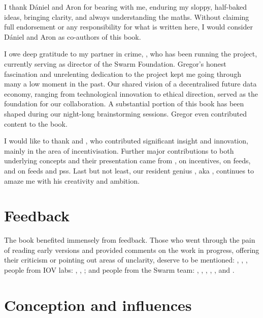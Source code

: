 I thank D{\'a}niel and Aron for bearing with me, enduring my sloppy, half-baked ideas, bringing clarity, and always understanding the maths.
Without claiming full endorsement or any responsibility for what is written here,
I would consider D{\'a}niel and Aron as co-authors of this book.

I owe deep gratitude to my partner in crime, , who has been running the project, currently serving as director of the Swarm Foundation. Gregor's honest fascination and unrelenting dedication to the project kept me going through many a low moment in the past. Our shared vision of a decentralised future data economy, ranging from technological innovation to ethical direction, served as the foundation for our collaboration. A substantial portion of this book has been shaped during our night-long brainstorming sessions. Gregor even contributed content to the book.

I would like to thank  and , who contributed significant insight and innovation, mainly in the area of incentivisation. 
Further major contributions to both underlying concepts and their presentation came from ,  on incentives,  
 on feeds, and  on feeds and pss. Last but not least, our resident genius , aka ,
continues to amaze me with his creativity and ambition.

\section*{Feedback}

The book benefited immensely from feedback. Those who went through the pain of reading early versions and provided comments on the work in progress, offering their criticism or pointing out areas of unclarity, deserve to be mentioned: , , ,  people from IOV labs:  , , ;
and people from the Swarm team:
, 
, ,  , , and .



\section*{Conception and influences}

